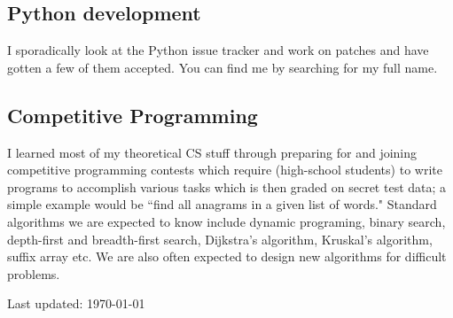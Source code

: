 \documentclass[letterpaper]{article}
\def\footerlink{}
\begin{document}
\subsection*{Python development}

I sporadically look at the Python issue tracker and work on patches and have gotten a few of them accepted. You can find me by searching for my full name.

\subsection*{Competitive Programming}

I learned most of my theoretical CS stuff through preparing for and joining competitive programming contests which require (high-school students) to write programs to accomplish various tasks which is then graded on secret test data; a simple example would be ``find all anagrams in a given list of words." Standard algorithms we are expected to know include dynamic programing, binary search, depth-first and breadth-first search, Dijkstra's algorithm, Kruskal's algorithm, suffix array etc. We are also often expected to design new algorithms for difficult problems.

\bigskip


\begin{center}
  \begin{footnotesize}
    Last updated: \today \\
    \href{\footerlink}{\texttt{\footerlink}}
  \end{footnotesize}
\end{center}
\end{document}
